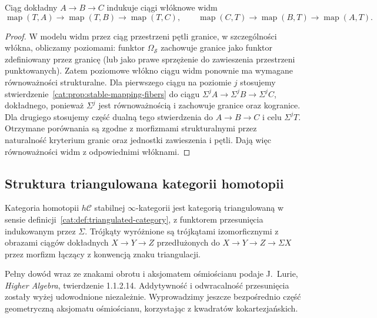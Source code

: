 \begin{stwierdzenie}\label{cat:prop:stable-mapping-spectrum-exact}
Ciąg dokładny $A\to B\to C$ indukuje ciągi włóknowe widm
\[
 \operatorname{map}(T,A)\to\operatorname{map}(T,B)\to\operatorname{map}(T,C),
 \qquad
 \operatorname{map}(C,T)\to\operatorname{map}(B,T)\to\operatorname{map}(A,T).
\]
\end{stwierdzenie}
\begin{proof}
W modelu widm przez ciąg przestrzeni pętli granice, w szczególności włókna, obliczamy poziomami: funktor $\Omega_{\mathcal S}$ zachowuje granice jako funktor zdefiniowany przez granicę (lub jako prawe sprzężenie do zawieszenia przestrzeni punktowanych). Zatem poziomowe włókno ciągu widm ponownie ma wymagane równoważności strukturalne. Dla pierwszego ciągu na poziomie $j$ stosujemy stwierdzenie~\ref{cat:prop:stable-mapping-fibers} do ciągu $\Sigma^j A\to\Sigma^j B\to\Sigma^j C$, dokładnego, ponieważ $\Sigma^j$ jest równoważnością i zachowuje granice oraz kogranice. Dla drugiego stosujemy część dualną tego stwierdzenia do $A\to B\to C$ i celu $\Sigma^jT$. Otrzymane porównania są zgodne z morfizmami strukturalnymi przez naturalność kryterium granic oraz jednostki zawieszenia i pętli. Dają więc równoważności widm z odpowiednimi włóknami.
\end{proof}

\subsection{Struktura triangulowana kategorii homotopii}

\begin{twierdzenie}\label{cat:thm:stable-triangulated}
Kategoria homotopii $h\mathcal C$ stabilnej $\infty$-kategorii jest kategorią triangulowaną w sensie definicji~\ref{cat:def:triangulated-category}, z funktorem przesunięcia indukowanym przez $\Sigma$. Trójkąty wyróżnione są trójkątami izomorficznymi z obrazami ciągów dokładnych $X\to Y\to Z$ przedłużonych do $X\to Y\to Z\to\Sigma X$ przez morfizm łączący z konwencją znaku triangulacji.
\end{twierdzenie}
Pełny dowód wraz ze znakami obrotu i aksjomatem ośmiościanu podaje J.~Lurie, \emph{Higher Algebra}, twierdzenie 1.1.2.14. Addytywność i odwracalność przesunięcia zostały wyżej udowodnione niezależnie. Wyprowadzimy jeszcze bezpośrednio część geometryczną aksjomatu ośmiościanu, korzystając z kwadratów kokartezjańskich.

